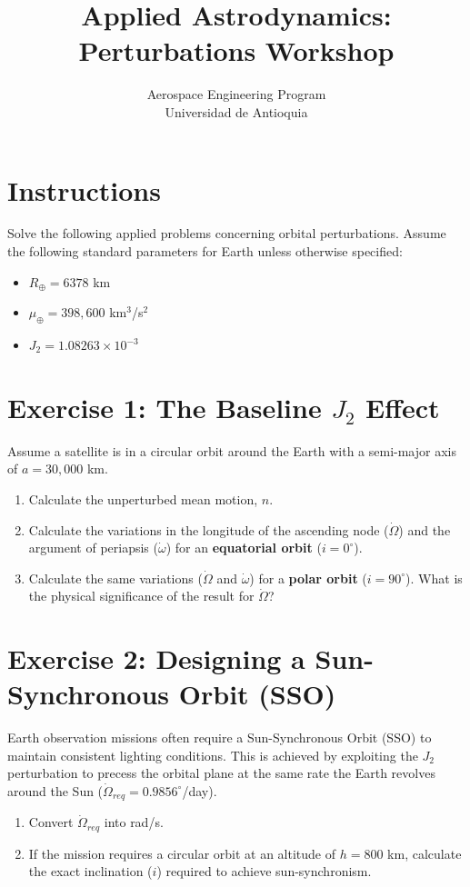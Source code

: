 \documentclass[12pt, letterpaper]{article}
\title{\textbf{Applied Astrodynamics: Perturbations Workshop}}
\author{Aerospace Engineering Program \\ Universidad de Antioquia}
\date{}
\begin{document}
\maketitle

\section*{Instructions}
Solve the following applied problems concerning orbital perturbations. Assume the following standard parameters for Earth unless otherwise specified:
\begin{itemize}
    \item $R_{\oplus} = 6378$ km
    \item $\mu_{\oplus} = 398,600$ km$^3$/s$^2$
    \item $J_2 = 1.08263 \times 10^{-3}$
\end{itemize}

\vspace{0.5cm}

\section*{Exercise 1: The Baseline $J_2$ Effect}
Assume a satellite is in a circular orbit around the Earth with a semi-major axis of $a = 30,000$ km. 
\begin{enumerate}
    \item[a)] Calculate the unperturbed mean motion, $n$.
    \item[b)] Calculate the variations in the longitude of the ascending node ($\dot{\Omega}$) and the argument of periapsis ($\dot{\omega}$) for an \textbf{equatorial orbit} ($i = 0^\circ$).
    \item[c)] Calculate the same variations ($\dot{\Omega}$ and $\dot{\omega}$) for a \textbf{polar orbit} ($i = 90^\circ$). What is the physical significance of the result for $\dot{\Omega}$?
\end{enumerate}

\section*{Exercise 2: Designing a Sun-Synchronous Orbit (SSO)}
Earth observation missions often require a Sun-Synchronous Orbit (SSO) to maintain consistent lighting conditions. This is achieved by exploiting the $J_2$ perturbation to precess the orbital plane at the same rate the Earth revolves around the Sun ($\dot{\Omega}_{req} = 0.9856^\circ$/day).
\begin{enumerate}
    \item[a)] Convert $\dot{\Omega}_{req}$ into rad/s.
    \item[b)] If the mission requires a circular orbit at an altitude of $h = 800$ km, calculate the exact inclination ($i$) required to achieve sun-synchronism.
\end{enumerate}
\end{document}
